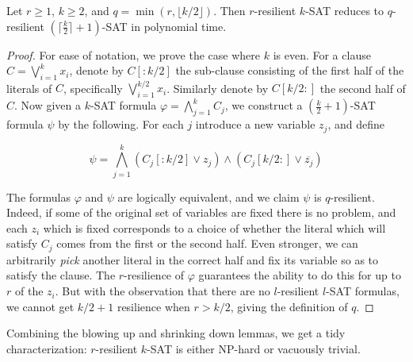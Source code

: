 \begin{lemma}
\label{lemma:down}
Let $r \geq 1$,  $k \geq 2$, and $q = \min(r, \lfloor k/2 \rfloor)$. Then
$r$-resilient $k$-SAT reduces to $q$-resilient $(\lceil \frac{k}{2} \rceil +
1)$-SAT in polynomial time.

\end{lemma}
\begin{proof}

For ease of notation, we prove the case where $k$ is even. For a clause $C =
\bigvee_{i=1}^k x_i$, denote by $C[:k/2]$ the sub-clause consisting of the
first half of the literals of $C$, specifically $\bigvee_{i=1}^{k/2} x_i$.
Similarly denote by $C[k/2:]$ the second half of $C$. Now given a $k$-SAT
formula $\varphi = \bigwedge_{j=1}^k C_j$, we construct a $(\frac{k}{2} +
1)$-SAT formula $\psi$ by the following. For each $j$ introduce a new variable
$z_j$, and  define

\[
   \psi = \bigwedge_{j=1}^k (C_j[:k/2] \vee z_j) \wedge (C_j[k/2:] \vee
\overline{z_j}) 
\]

The formulas $\varphi$ and $\psi$ are logically equivalent, and we claim $\psi$
is $q$-resilient. Indeed, if some of the original set of variables are fixed
there is no problem, and each $z_i$ which is fixed corresponds to a choice
of whether the literal which will satisfy $C_j$ comes from the first or the
second half. Even stronger, we can arbitrarily \emph{pick} another literal in
the correct half and fix its variable so as to satisfy the clause. The
$r$-resilience of $\varphi$ guarantees the ability to do this for up to $r$ of
the $z_i$. But with the observation that there are no $l$-resilient
$l$-SAT formulas, we cannot get $k/2 + 1$ resilience when $r > k/2$, giving the
definition of $q$.
\end{proof}

Combining the blowing up and shrinking down lemmas, we get a tidy
characterization: $r$-resilient $k$-SAT is either NP-hard or vacuously trivial.

